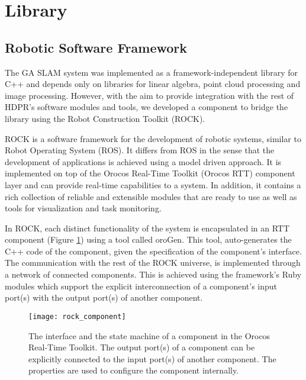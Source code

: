 \section{Library}

\subsection{Robotic Software Framework}

The GA SLAM system was implemented as a framework-independent library for C++
and depends only on libraries for linear algebra, point cloud processing
and image processing.
However, with the aim to provide integration with the rest of HDPR's
software modules and tools, we developed a component to bridge
the library using the Robot Construction Toolkit (ROCK).

ROCK is a software framework for the development of robotic systems,
similar to Robot Operating System (ROS).
It differs from ROS in the sense that the development of applications
is achieved using a model driven approach.
It is implemented on top of the Orocos Real-Time Toolkit (Orocos RTT)
component layer and can provide real-time capabilities to a system.
In addition, it contains a rich collection of reliable and extensible
modules that are ready to use as well as tools for visualization and
task monitoring.

In ROCK, each distinct functionality of the system is
encapsulated in an RTT component (Figure \ref{fig:rock_component}) using a
tool called oroGen.
This tool, auto-generates the C++ code of the component, given
the specification of the component's interface.
The communication with the rest of the ROCK universe, is implemented through
a network of connected components.
This is achieved using the framework's Ruby modules which support the explicit
interconnection of a component's input port(s) with the output port(s)
of another component.

\begin{figure}[h!]
    \centering
    \texttt{[image: rock\_component]}
    \decoRule
    \caption[ROCK component interface]{
        The interface and the state machine of a component in the Orocos
        Real-Time Toolkit. The output port(s) of a component can be explicitly
        connected to the input port(s) of another component. The properties
        are used to configure the component internally.
    }
    \label{fig:rock_component}
\end{figure}

